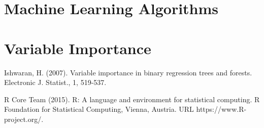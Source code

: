 \begin{thebibliography}{00}
\section{Machine Learning Algorithms}

\section{Variable Importance}

Ishwaran, H. (2007). 
\newblock Variable importance in binary regression trees and forests. 
\newblock Electronic J. Statist., 1, 519-537.

R Core Team (2015). 
\newblock R: A language and environment for statistical computing. R Foundation for Statistical Computing, Vienna, Austria.
\newblock URL https://www.R-project.org/.

\end{thebibliography}



